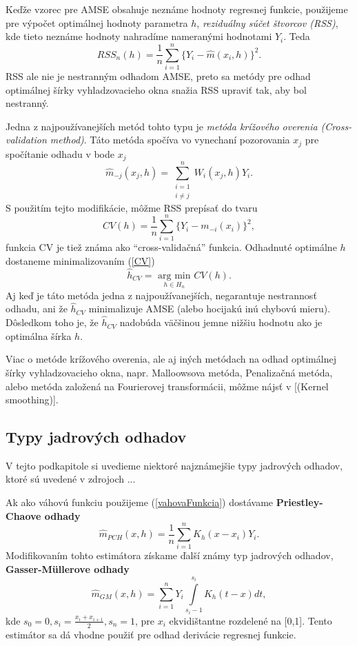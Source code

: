 Keďže vzorec pre AMSE obsahuje neznáme hodnoty regresnej funkcie, použijeme pre výpočet optimálnej hodnoty parametra $h$, \textit{reziduálny súčet štvorcov (RSS)}, kde tieto neznáme hodnoty nahradíme nameranými hodnotami $Y_i$.
Teda
\begin{equation}
 RSS_n(h) = \frac{1}{n}\sum\limits_{i=1}^{n} {\{Y_i - \hat{m}(x_i,h)\}}^2.
\end{equation}
 RSS ale nie je nestranným odhadom AMSE, preto sa metódy pre odhad optimálnej šírky vyhladzovacieho okna snažia RSS upraviť tak, aby bol nestranný. 
 
 Jedna z najpoužívanejších metód tohto typu je \textit{metóda krížového overenia (Cross-validation method)}. Táto metóda spočíva vo vynechaní pozorovania $x_j$ pre spočítanie odhadu v bode $x_j$
 \begin{equation*}
\hat{m}_{-j}(x_j,h) = \sum\limits_{\substack{i=1 \\ i\neq j}}^{n}W_i(x_j,h)Y_i.
\end{equation*}
S použitím tejto modifikácie, môžme RSS prepísať do tvaru
\begin{equation}\label{CV}
CV(h) = \frac{1}{n}\sum\limits_{i=1}^{n} {\{Y_i - m_{-i}(x_i)\}}^2,
\end{equation}
funkcia CV je tiež známa ako ``cross-validačná'' funkcia. Odhadnuté optimálne $h$ dostaneme minimalizovaním (\ref{CV})
\begin{equation}
\hat{h}_{CV} = \underset{h \in H_n}{\textrm{ arg min }} CV(h).
\end{equation}
Aj keď je táto metóda jedna z najpoužívanejších, negarantuje nestrannosť odhadu, ani že $\hat{h}_{CV}$ minimalizuje AMSE (alebo hocijakú inú chybovú mieru). Dôsledkom toho je, že $\hat{h}_{CV}$  nadobúda väčšinou jemne nižšiu hodnotu ako je optimálna šírka $h$.

Viac o metóde krížového overenia, ale aj iných metódach na odhad optimálnej šírky vyhladzovacieho okna, napr. Malloowsova metóda, Penalizačná metóda, alebo metóda založená na Fourierovej transformácii, môžme nájsť v [(Kernel smoothing)].
\subsection{Typy jadrových odhadov}
V tejto podkapitole si uvedieme niektoré najznámejšie typy jadrových odhadov, ktoré sú uvedené v zdrojoch ...

Ak ako váhovú funkciu použijeme (\ref{vahovaFunkcia}) dostávame \textbf{Priestley-Chaove odhady}
\begin{equation}
\hat{m}_{PCH}(x,h) = \frac{1}{n} \sum\limits_{i=1}^{n} K_h(x - x_i)Y_i.
\end{equation}
Modifikovaním tohto estimátora získame ďalší známy typ jadrových odhadov, \textbf{Gasser-Müllerove odhady}
\begin{equation}
\hat{m}_{GM}(x,h) = \sum\limits_{i=1}^{n} Y_i \int\limits_{s_i-1}^{s_i}K_h(t-x)dt,
\end{equation}
kde $s_0 = 0 , s_i = \frac{x_i + x_{i+1}}{2}, s_n = 1$, pre $x_i$ ekvidištantne rozdelené na [0,1]. Tento estimátor sa dá vhodne použiť pre odhad derivácie regresnej funkcie.

